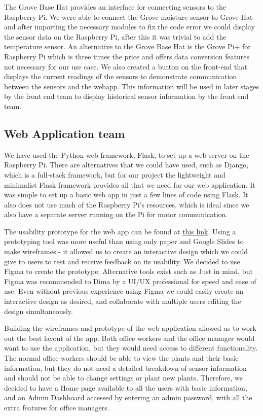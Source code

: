 \documentclass{article}
\begin{document}
The Grove Base Hat provides an interface for connecting sensors to the Raspberry Pi. We were able to connect the Grove moisture sensor to Grove Hat and after importing the necessary modules to fix the code error we could display the sensor data on the Raspberry Pi, after this it was trivial to add the temperature sensor.
An alternative to the Grove Base Hat is the Grove Pi+ for Raspberry Pi which is three times the price and offers data conversion features not necessary for our use case. 
We also created a button on the front-end that displays the current readings of the sensors to demonstrate communication between the sensors and the webapp. This information will be used in later stages by the front end team to display historical sensor information by the front end team.


\subsection{Web Application team}
We have used the Python web framework, Flask, to set up a web server on the Raspberry Pi. There are alternatives that we could have used, such as  Django, which is a full-stack framework, but for our project the lightweight and minimalist Flask framework provides all that we need for our web application. It was simple to set up a basic web app in just a few lines of code using Flask. It also does not use much of the Raspberry Pi’s resources, which is ideal since we also have a separate server running on the Pi for motor communication.

The usability prototype for the web app can be found at \href{https://www.figma.com/proto/2DwWDgggZoKzpLGs5jLPee/Sprout.ed?node-id=5\%3A3&scaling=contain}{this link}. Using a prototyping tool was more useful than using only paper and Google Slides to make wireframes - it allowed us to create an interactive design which we could give to users to test and receive feedback on its usability. We decided to use Figma to create the prototype. Alternative tools exist such as Just in mind, but Figma was recommended to Dima by a UI/UX professional for speed and ease of use. Even without previous experience using Figma we could easily create an interactive design as desired, and collaborate with multiple users editing the design simultaneously.

Building the wireframes and prototype of the web application allowed us to work out the best layout of the app. Both office workers and the office manager would want to use the application, but they would need access to different functionality. The normal office workers should be able to view the plants and their basic information, but they do not need a detailed breakdown of sensor information and should not be able to change settings or plant new plants. Therefore, we decided to have a Home page available to all the users with basic information, and an Admin Dashboard accessed by entering an admin password, with all the extra features for office managers.
\end{document}
